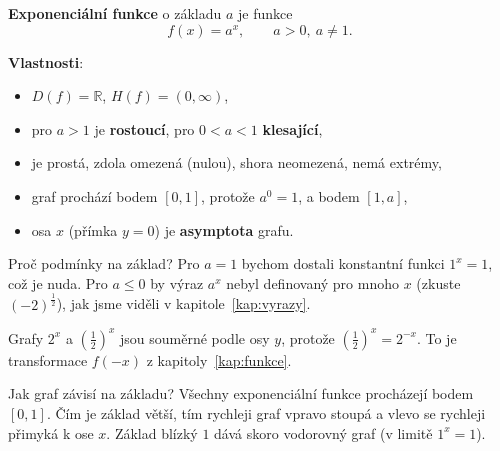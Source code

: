 \begin{definitionbox}
  \textbf{Exponenciální funkce} o základu $a$ je funkce
  \begin{equation*}
    f(x) = a^x,\qquad a > 0,\ a\neq 1.
  \end{equation*}

  \textbf{Vlastnosti}:
  \begin{itemize}
    \item $D(f) = \mathbb{R}$, $H(f) = (0, \infty)$,
    \item pro $a > 1$ je \textbf{rostoucí}, pro $0 < a < 1$ \textbf{klesající},
    \item je prostá, zdola omezená (nulou), shora neomezená, nemá extrémy,
    \item graf prochází bodem $[0, 1]$, protože $a^0 = 1$, a bodem $[1, a]$,
    \item osa $x$ (přímka $y = 0$) je \textbf{asymptota} grafu.
  \end{itemize}
\end{definitionbox}

Proč podmínky na základ? Pro $a = 1$ bychom dostali konstantní funkci $1^x = 1$, což je nuda. Pro $a\leq 0$ by výraz $a^x$ nebyl definovaný pro mnoho $x$ (zkuste ${(-2)}^{\frac{1}{2}}$), jak jsme viděli v kapitole~\ref{kap:vyrazy}.

\begin{center}
\end{center}

Grafy $2^x$ a ${\left(\frac{1}{2}\right)}^x$ jsou souměrné podle osy $y$, protože ${\left(\frac{1}{2}\right)}^x = 2^{-x}$. To je transformace $f(-x)$ z kapitoly~\ref{kap:funkce}.

Jak graf závisí na základu? Všechny exponenciální funkce procházejí bodem $[0, 1]$. Čím je základ větší, tím rychleji graf vpravo stoupá a vlevo se rychleji přimyká k ose $x$. Základ blízký $1$ dává skoro vodorovný graf (v limitě $1^x = 1$).

